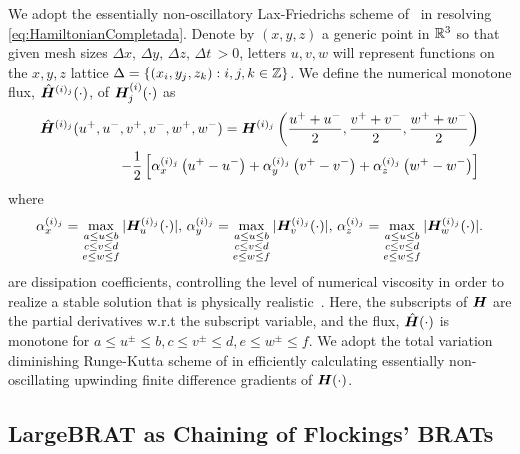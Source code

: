We adopt the essentially non-oscillatory Lax-Friedrichs scheme of~\cite{OsherShuENO, Crandall1984Approx} in resolving \eqref{eq:HamiltonianCompletada}. Denote by $(x, y, z)$ a generic point in $\mathbb{R}^3$ so that given mesh sizes $\Delta x, \, \Delta y, \, \Delta z, \, \Delta t \, > 0$, letters $u,v,w$ will represent functions on the $x,y,z$ lattice $\Delta=\{(x_i,y_j, z_k): i, j, k \in \mathbb{Z}\}$. We define the numerical monotone flux, 	$\hat{\bm{H}}^{(i)_j}(\cdot)$, of $\bm{H}_j^{(i)}(\cdot)$ as 
%
\begin{align}
	\hat{\bm{H}}^{(i)_j}(u^+, u^-, v^+, v^-, w^+, w^-) = \bm{H}^{(i)_j}\left(\frac{u^+ +u^-}{2}, \frac{v^+ +v^-}{2}, \frac{w^+ +w^-}{2}\right) \nonumber
	\\
	- \dfrac{1}{2}\left[ \alpha_x^{(i)_j} \left(u^+ - u^-\right) + \alpha_y^{(i)_j}\left(v^+ - v^-\right) + \alpha_z^{(i)_j}\left(w^+ - w^-\right)\right]
\end{align}
%
where
%
\begin{align}
	\alpha_x^{(i)_j} = \max_{\substack{ a \le u \le b \\ c \le v \le d  \\ e \le w \le f}} |\hamfunc_{u}^{(i)_j}(\cdot)|, %
	\, \alpha_y^{(i)_j} = \max_{\substack{ a \le u \le b \\ c \le v \le d  \\ e \le w \le f}} |\hamfunc_{v}^{(i)_j}(\cdot)|, %
	\, \alpha_z^{(i)_j} = \max_{\substack{ a \le u \le b \\ c \le v \le d  \\ e \le w \le f}} |\hamfunc_{w}^{(i)_j}(\cdot)|. %
\end{align}
%
are dissipation coefficients, controlling the level of numerical viscosity in order to realize a stable solution that is physically realistic~\cite{Crandall1984Approx}. Here, the subscripts of $\bm{H}$ are the partial derivatives w.r.t the subscript variable, and the flux, $\hat{\bm{H}}(\cdot)$ is monotone for $a \le u^\pm \le b, c \le v^\pm \le d, e \le w^\pm \le f$. We adopt the total variation diminishing Runge-Kutta scheme of \cite{Osher1987} in efficiently calculating essentially non-oscillating upwinding finite difference gradients of $\bm{H}(\cdot)$.

\subsection{LargeBRAT as Chaining of Flockings' BRATs}
% 
\label{sucsec:murmur_funnels}

